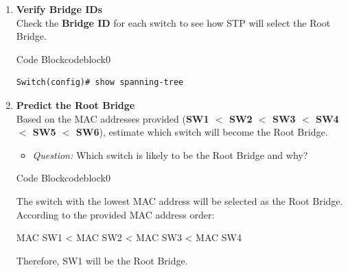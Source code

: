 \documentclass[a4paper]{book}
\begin{document}
\begin{enumerate}
\begin{ocg}{Code Block}{codeblock}{0}
\begin{lstlisting}
\end{lstlisting}

\end{ocg}

    \item \textbf{Verify Bridge IDs} \\
    Check the \textbf{Bridge ID} for each switch to see how STP will select the Root Bridge.



\begin{ocg}{Code Block}{codeblock}{0}
\vspace{0.5cm}
\begin{lstlisting}
Switch(config)# show spanning-tree
\end{lstlisting}

\end{ocg}
    
    \item \textbf{Predict the Root Bridge} \\
    Based on the MAC addresses provided (\textbf{SW1 $<$ SW2 $<$ SW3 $<$ SW4 $<$ SW5 $<$ SW6}), estimate which switch will become the Root Bridge.
    \begin{itemize}
        \item \textit{Question:} Which switch is likely to be the Root Bridge and why?
    \end{itemize}

    


\begin{ocg}{Code Block}{codeblock}{0}
\vspace{0.5cm}
\begin{tcolorbox}
\small{
The switch with the lowest MAC address will be selected as the Root Bridge. According to the provided MAC address order:

MAC SW1 < MAC SW2 < MAC SW3 < MAC SW4

Therefore, SW1 will be the Root Bridge.
}
\end{tcolorbox}
\end{ocg}




\end{enumerate}
\end{document}
